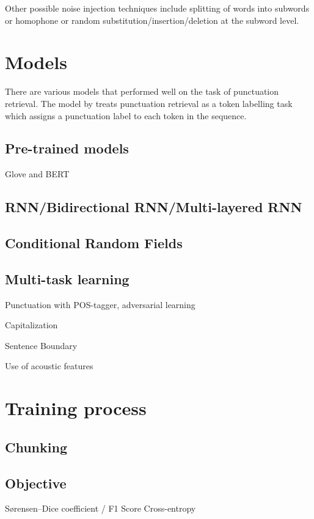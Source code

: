 \documentclass[a4paper]{article}
\begin{document}
Other possible noise injection techniques include splitting of words into subwords or homophone or random substitution/insertion/deletion at the subword level.

\section{Models}
There are various models that performed well on the task of punctuation retrieval. 
The model by \cite{translation} treats punctuation retrieval as a token labelling task which assigns a punctuation label to each token in the sequence.
\subsection{Pre-trained models}
Glove and BERT
\subsection{RNN/Bidirectional RNN/Multi-layered RNN}
\subsection{Conditional Random Fields}

\subsection{Multi-task learning}
Punctuation with POS-tagger, adversarial learning

Capitalization

Sentence Boundary \cite{dynamiccrf}

Use of acoustic features


\section{Training process}
\subsection{Chunking}
\subsection{Objective}
Sørensen–Dice coefficient / F1 Score
Cross-entropy



\end{document}
